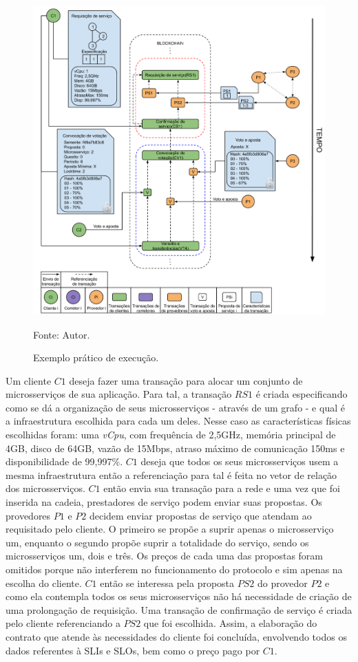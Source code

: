 \begin{figure}[ht!]
\caption{Exemplo prático de execução.}
\centering
\includegraphics[width=1\textwidth]{imagens/exemplo_execucao.png}
\begin{center}
        Fonte: Autor.
\end{center}
\label{fig:exemplo_execucao}
\end{figure}

Um cliente $C1$ deseja fazer uma transação para alocar um conjunto de microsserviços de sua aplicação. Para tal, a transação $RS1$ é criada especificando como se dá a organização de seus microsserviços - através de um grafo - e qual é a infraestrutura escolhida para cada um deles. Nesse caso as características físicas escolhidas foram: uma \textit{vCpu}, com frequência de 2,5GHz, memória principal de 4GB, disco de 64GB, vazão de 15Mbps, atraso máximo de comunicação 150ms e disponibilidade de 99,997\%. $C1$ deseja que todos os seus microsserviços usem a mesma infraestrutura então a referenciação para tal é feita no vetor de relação dos microsserviços. $C1$ então envia sua transação para a rede e uma vez que foi inserida na cadeia, prestadores de serviço podem enviar suas propostas. Os provedores $P1$ e $P2$ decidem enviar propostas de serviço que atendam ao requisitado pelo cliente. O primeiro se propõe a suprir apenas o microsserviço um, enquanto o segundo propõe suprir a totalidade do serviço, sendo os microsserviços um, dois e três. Os preços de cada uma das propostas foram omitidos porque não interferem no funcionamento do protocolo e sim apenas na escolha do cliente. $C1$ então se interessa pela proposta $PS2$ do provedor $P2$ e como ela contempla todos os seus microsserviços não há necessidade de criação de uma prolongação de requisição. Uma transação de confirmação de serviço é criada pelo cliente referenciando a $PS2$ que foi escolhida. Assim, a elaboração do contrato que atende às necessidades do cliente foi concluída, envolvendo todos os dados referentes à \acp{SLI} e \acp{SLO}, bem como o preço pago por $C1$.

